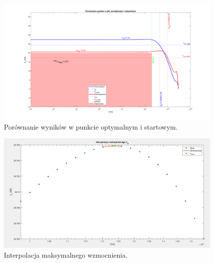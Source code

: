 \documentclass{article}
\begin{document}
\pagebreak
\begin{landscape}
    \begin{figure}[h]
        \vspace*{-2cm}
        \includegraphics[width=25cm,height=15 cm]{graphics/comparison.png}
        \centering
        \caption{Porównanie wyników w punkcie optymalnym i startowym.}
    \end{figure}
\end{landscape}

\pagebreak
\begin{landscape}
    \begin{figure}[h]
        \vspace*{-2cm}
        \includegraphics[width=20cm,height=10 cm]{graphics/max_ku_interp.png}
        \centering
        \caption{Interpolacja maksymalnego wzmocnienia.}
    \end{figure}
\end{landscape}
\end{document}

